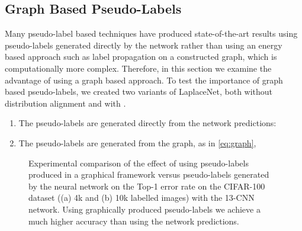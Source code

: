 \documentclass[journal]{IEEEtran}
\begin{document}
\begin{table}
  \centering
  \caption{The effect on Top-1 error rate by scaling up the neural network in size from a WRN-28-2 to a WRN-28-8 on the CIFAR-10/100 datasets.}
  \label{table:cifar-bigger-compare}
\end{table}


\subsection{Graph Based Pseudo-Labels}
Many pseudo-label based techniques \cite{sohn2020fixmatch} \cite{arazo2019pseudo} have produced state-of-the-art results using pseudo-labels generated directly by the network rather than using an energy based approach such as label propagation on a constructed graph, which is computationally more complex. Therefore, in this section we examine the advantage of using a graph based approach. To test the importance of graph based pseudo-labels, we created two variants of LaplaceNet, both without distribution alignment and with . 

\begin{enumerate}
    \item The pseudo-labels are generated directly from the network predictions:  
    \item The pseudo-labels are generated from the graph, as in \eqref{eq:graph},  
\end{enumerate}



\begin{figure*}
    \centering
    \qquad
    \caption{Experimental comparison of the effect of using pseudo-labels produced in a graphical framework versus pseudo-labels generated by the neural network on the Top-1 error rate on the CIFAR-100 dataset ((a) 4k and (b) 10k labelled images) with the 13-CNN network. Using graphically produced pseudo-labels we achieve a much higher accuracy than using the network predictions.}\label{fig:graphvsmodel}\end{figure*}
\end{document}

